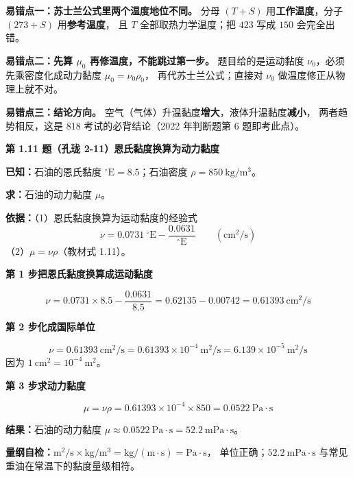 \begin{yicuo}
\textbf{易错点一：苏士兰公式里两个温度地位不同。}
分母 $(T+S)$ 用\textbf{工作温度}，分子 $(273+S)$ 用\textbf{参考温度}，
且 $T$ 全部取热力学温度；把 $423$ 写成 $150$ 会完全出错。

\textbf{易错点二：先算 $\mu_0$ 再修温度，不能跳过第一步。}
题目给的是运动黏度 $\nu_0$，必须先乘密度化成动力黏度 $\mu_0=\nu_0\rho_0$，
再代苏士兰公式；直接对 $\nu_0$ 做温度修正从物理上就不对。

\textbf{易错点三：结论方向。}
空气（气体）升温黏度\textbf{增大}，液体升温黏度\textbf{减小}，
两者趋势相反，这是 818 考试的必背结论（2022 年判断题第 6 题即考此点）。
\end{yicuo}

\noindent\textbf{第 1.11 题（孔珑 2-11）\quad 恩氏黏度换算为动力黏度}

\begin{jie}
\textbf{已知：}石油的恩氏黏度 $^{\circ}\mathrm{E}=8.5$；石油密度 $\rho=850\ \mathrm{kg/m^3}$。

\textbf{求：}石油的动力黏度 $\mu$。

\textbf{依据：}（1）恩氏黏度换算为运动黏度的经验式
\[ \nu=0.0731\ ^{\circ}\mathrm{E}-\frac{0.0631}{^{\circ}\mathrm{E}}\qquad(\mathrm{cm^2/s}) \]
（2）$\mu=\nu\rho$（教材式 1.11）。

\textbf{第 1 步\quad 把恩氏黏度换算成运动黏度}

\[ \nu=0.0731\times8.5-\frac{0.0631}{8.5}=0.62135-0.00742=0.61393\ \mathrm{cm^2/s} \]

\textbf{第 2 步\quad 化成国际单位}

\[ \nu=0.61393\ \mathrm{cm^2/s}=0.61393\times10^{-4}\ \mathrm{m^2/s}=6.139\times10^{-5}\ \mathrm{m^2/s} \]
因为 $1\ \mathrm{cm^2}=10^{-4}\ \mathrm{m^2}$。

\textbf{第 3 步\quad 求动力黏度}

\[ \mu=\nu\rho=0.61393\times10^{-4}\times850=0.0522\ \mathrm{Pa\cdot s} \]

\textbf{结果：}石油的动力黏度 $\mu\approx0.0522\ \mathrm{Pa\cdot s}=52.2\ \mathrm{mPa\cdot s}$。

\textbf{量纲自检：}$\mathrm{m^2/s}\times\mathrm{kg/m^3}=\mathrm{kg/(m\cdot s)}=\mathrm{Pa\cdot s}$，
单位正确；$52.2\ \mathrm{mPa\cdot s}$ 与常见重油在常温下的黏度量级相符。
\end{jie}

